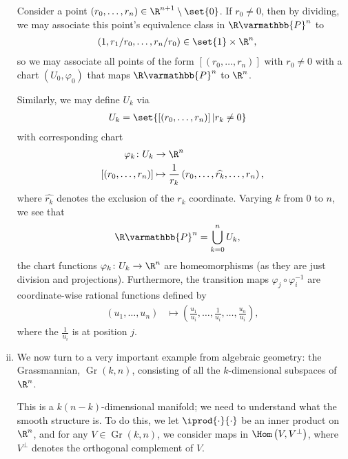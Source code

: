 \documentclass[10pt]{mypackage}
\renewcommand*{\mathbb}[1]{\varmathbb{#1}}
\begin{document}
\begin{enumerate}[(i)]
    Consider a point $\left( r_0,\dots,r_n \right)\in \R^{n+1}\setminus \set{0}$. If $r_0\neq 0$, then by dividing, we may associate this point's equivalence class in $\R\mathbb{P}^{n}$ to
    \begin{align*}
      \left( 1,r_1/r_0,\dots,r_n/r_0 \right) &\in \set{1}\times \R^{n},
    \end{align*}
    so we may associate all points of the form $\left[ \left( r_0,\dots,r_n \right) \right]$ with $r_0\neq 0$ with a chart $\left( U_{0},\varphi_{0} \right)$ that maps $\R\mathbb{P}^{n}$ to $\R^{n}$.\newline

    Similarly, we may define $U_{k}$ via
    \begin{align*}
      U_{k} &= \set{\left[ \left( r_0,\dots,r_n \right) \right] | r_k\neq 0}
    \end{align*}
    with corresponding chart
    \begin{align*}
      \varphi_{k}\colon U_{k}&\rightarrow \R^{n}\\
      \left[ \left( r_0,\dots,r_n \right) \right] &\mapsto \frac{1}{r_{k}} \left( r_0,\dots,\widehat{r_k},\dots,r_n \right),
    \end{align*}
    where $\widehat{r_k}$ denotes the exclusion of the $r_k$ coordinate. Varying $k$ from $0$ to $n$, we see that
    \begin{align*}
      \R\mathbb{P}^{n} &= \bigcup_{k=0}^{n}U_k,
    \end{align*}
    the chart functions $\varphi_{k}\colon U_k\rightarrow \R^{n}$ are homeomorphisms (as they are just division and projections). Furthermore, the transition maps $\varphi_{j}\circ\varphi_{i}^{-1}$ are coordinate-wise rational functions defined by
    \begin{align*}
      \left( u_1,\dots,u_n \right) &\mapsto \left( \frac{u_1}{u_i},\dots,\frac{1}{u_i},\dots,\frac{u_n}{u_i} \right),
    \end{align*}
    where the $\frac{1}{u_i}$ is at position $j$.
  \item We now turn to a very important example from algebraic geometry: the Grassmannian, $\operatorname{Gr}\left( k,n \right)$, consisting of all the $k$-dimensional subspaces of $\R^{n}$.\newline

    This is a $k\left( n-k \right)$-dimensional manifold; we need to understand what the smooth structure is. To do this, we let $ \iprod{\cdot}{\cdot} $ be an inner product on $\R^{n}$, and for any $V\in \operatorname{Gr}\left( k,n \right)$, we consider maps in $\Hom\left( V,V^{\perp} \right)$, where $V^{\perp}$ denotes the orthogonal complement of $V$.\newline


\end{enumerate}
\end{document}
